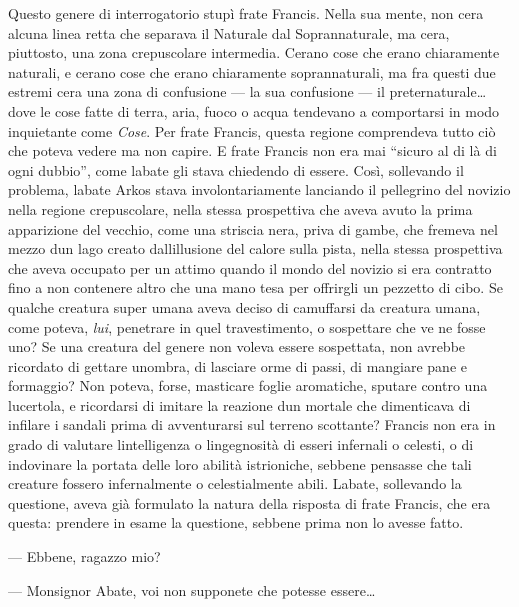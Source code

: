 Questo genere di interrogatorio stupì frate Francis. Nella sua mente,
non c\textquotesingle era alcuna linea retta che separava il Naturale
dal Soprannaturale, ma c\textquotesingle era, piuttosto, una zona
crepuscolare intermedia. C\textquotesingle erano cose che erano
chiaramente naturali, e c\textquotesingle erano cose che erano
chiaramente soprannaturali, ma fra questi due estremi
c\textquotesingle era una zona di confusione --- la sua confusione ---
il preternaturale\ldots{} dove le cose fatte di terra, aria, fuoco o
acqua tendevano a comportarsi in modo inquietante come \emph{Cose}. Per
frate Francis, questa regione comprendeva tutto ciò che poteva vedere ma
non capire. E frate Francis non era mai ``sicuro al di là di ogni
dubbio'', come l\textquotesingle abate gli stava chiedendo di essere.
Così, sollevando il problema, l\textquotesingle abate Arkos stava
involontariamente lanciando il pellegrino del novizio nella regione
crepuscolare, nella stessa prospettiva che aveva avuto la prima
apparizione del vecchio, come una striscia nera, priva di gambe, che
fremeva nel mezzo d\textquotesingle un lago creato
dall\textquotesingle illusione del calore sulla pista, nella stessa
prospettiva che aveva occupato per un attimo quando il mondo del novizio
si era contratto fino a non contenere altro che una mano tesa per
offrirgli un pezzetto di cibo. Se qualche creatura super umana aveva
deciso di camuffarsi da creatura umana, come poteva, \emph{lui},
penetrare in quel travestimento, o sospettare che ve ne fosse uno? Se
una creatura del genere non voleva essere sospettata, non avrebbe
ricordato di gettare un\textquotesingle ombra, di lasciare orme di
passi, di mangiare pane e formaggio? Non poteva, forse, masticare foglie
aromatiche, sputare contro una lucertola, e ricordarsi di imitare la
reazione d\textquotesingle un mortale che dimenticava di infilare i
sandali prima di avventurarsi sul terreno scottante? Francis non era in
grado di valutare l\textquotesingle intelligenza o
l\textquotesingle ingegnosità di esseri infernali o celesti, o di
indovinare la portata delle loro abilità istrioniche, sebbene pensasse
che tali creature fossero infernalmente o celestialmente abili.
L\textquotesingle abate, sollevando la questione, aveva già formulato la
natura della risposta di frate Francis, che era questa: prendere in
esame la questione, sebbene prima non lo avesse fatto.

--- Ebbene, ragazzo mio?

--- Monsignor Abate, voi non supponete che potesse essere\ldots{}

